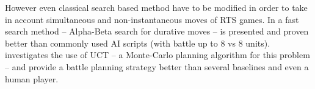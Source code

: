 
However even classical search based method have to be modified in order to take in account simultaneous and non-instantaneous moves of RTS games.
In \cite{abcd} a fast search method -- Alpha-Beta search for durative moves -- is presented and proven better than commonly used AI scripts (with battle up to 8 vs 8 units). 
\cite{wargusuct} investigates the use of UCT -- a Monte-Carlo planning algorithm for this problem -- and provide a battle planning strategy better than several baselines and even a human player.
